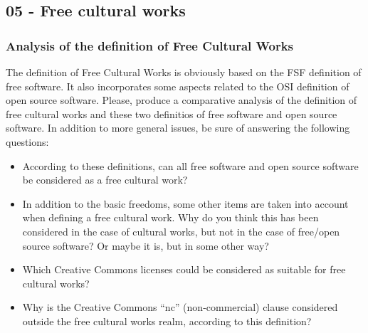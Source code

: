 \documentclass[a4paper]{article}
\begin{document}
\subsection{05 - Free cultural works}

\subsubsection{Analysis of the definition of Free Cultural Works}
\label{exe:defintion-free-cultural-works}

The definition of Free Cultural Works is obviously based on the FSF definition of free software. It also incorporates some aspects related to the OSI definition of open source software. Please, produce a comparative analysis of the definition of free cultural works and these two definitios of free software and open source software. In addition to more general issues, be sure of answering the following questions:

\begin{itemize}
\item According to these definitions, can all free software and open source software be considered as a free cultural work?
\item In addition to the basic freedoms, some other items are taken into account when defining a free cultural work. Why do you think this has been considered in the case of cultural works, but not in the case of free/open source software? Or maybe it is, but in some other way?
\item Which Creative Commons licenses could be considered as suitable for free cultural works?
\item Why is the Creative Commons ``nc'' (non-commercial) clause considered outside the free cultural works realm, according to this definition?
\end{itemize}
\end{document}
